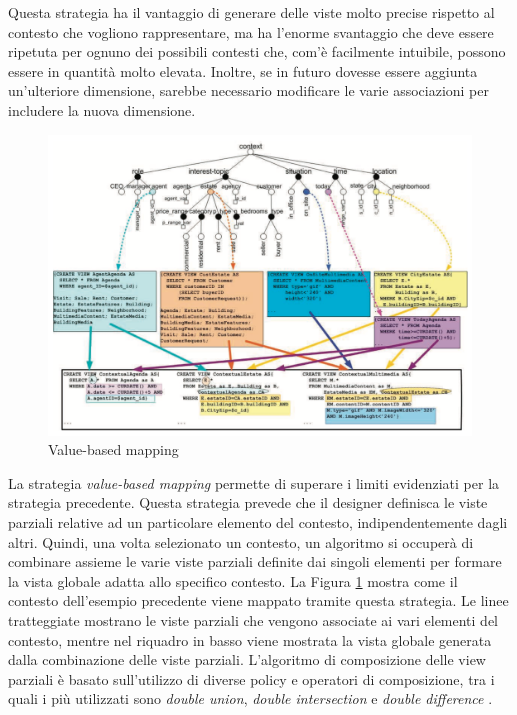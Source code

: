 Questa strategia ha il vantaggio di generare delle viste molto precise rispetto al contesto che vogliono rappresentare, ma ha l'enorme svantaggio che deve essere ripetuta per ognuno dei possibili contesti che, com'è facilmente intuibile, possono essere in quantità molto elevata. Inoltre, se in futuro dovesse essere aggiunta un'ulteriore dimensione, sarebbe necessario modificare le varie associazioni per includere la nuova dimensione.

\begin{figure}[ht]
	\centering
	\includegraphics[width=\textwidth]{2-nozioni-preliminari/Immagini/value-based-mapping.png}
	\caption{Value-based mapping}\label{fig:value-based-mapping}
\end{figure}

La strategia \emph{value-based mapping} permette di superare i limiti evidenziati per la strategia precedente. Questa strategia prevede che il designer definisca le viste parziali relative ad un particolare elemento del contesto, indipendentemente dagli altri. Quindi, una volta selezionato un contesto, un algoritmo si occuperà di combinare assieme le varie viste parziali definite dai singoli elementi per formare la vista globale adatta allo specifico contesto. La Figura \ref{fig:value-based-mapping} mostra come il contesto dell'esempio precedente viene mappato tramite questa strategia. Le linee tratteggiate mostrano le viste parziali che vengono associate ai vari elementi del contesto, mentre nel riquadro in basso viene mostrata la vista globale generata dalla combinazione delle viste parziali. L'algoritmo di composizione delle view parziali è basato sull'utilizzo di diverse policy e operatori di composizione, tra i quali i più utilizzati sono \emph{double union}, \emph{double intersection} e \emph{double difference} \cite{DBLP:conf/er/BolchiniQR07}.

